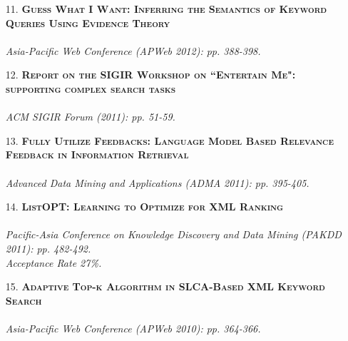 \documentclass[a4paper, 11pt]{article}
\begin{document}
\begin{itemize}
        
\item[\color{bl3} 11.]{\scshape\color{bl3}\bf Guess What I Want: Inferring the Semantics of Keyword Queries Using Evidence Theory}\\
\\
\emph{ Asia-Pacific Web Conference (APWeb 2012): pp. 388-398.}
\vspace{2mm}



\item[\color{bl3} 12.]{\scshape\color{bl3}\bf Report on the SIGIR Workshop on ``Entertain Me": supporting complex search tasks}\\
\\
\emph{ ACM SIGIR Forum (2011): pp. 51-59.}
\vspace{2mm}

\item[\color{bl3} 13.]{\scshape\color{bl3}\bf Fully Utilize Feedbacks: Language Model Based Relevance Feedback in Information Retrieval}\\
\\
\emph{ Advanced Data Mining and Applications (ADMA 2011): pp. 395-405.}
\vspace{2mm}

\item[\color{bl3} 14.]{\scshape\color{bl3}\bf ListOPT: Learning to Optimize for XML Ranking}\\
\\
\emph{ Pacific-Asia Conference on Knowledge Discovery and Data Mining (PAKDD 2011): pp. 482-492.\\Acceptance Rate 27\%.}

\vspace{2mm}

\item[\color{bl3} 15.]{\scshape\color{bl3}\bf Adaptive Top-k Algorithm in SLCA-Based XML Keyword Search}\\
\\
\emph{ Asia-Pacific Web Conference (APWeb 2010): pp. 364-366.}
\vspace{2mm}


\end{itemize}
\end{document}
